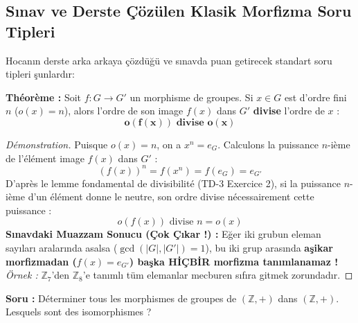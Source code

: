 \documentclass[12pt,a4paper]{report}
\begin{document}
\vspace{0.5cm}

\subsection*{Sınav ve Derste Çözülen Klasik Morfizma Soru Tipleri}

Hocanın derste arka arkaya çözdüğü ve sınavda puan getirecek standart soru tipleri şunlardır:

\begin{tcolorbox}[colback=red!5!white,colframe=red!75!black,title=Soru Tipi 1 (Banko Teorem) : Eleman Mertebesi Morfizmada Bölünür !]
\textbf{Théorème :} Soit $f : G \longrightarrow G'$ un morphisme de groupes.  
Si $x \in G$ est d'ordre fini $n$ ($o(x) = n$), alors l'ordre de son image $f(x)$ dans $G'$ \textbf{divise} l'ordre de $x$ :
\[ \mathbf{o(f(x)) \text{ divise } o(x)} \]
\end{tcolorbox}

\begin{proof}[Démonstration]
Puisque $o(x) = n$, on a $x^n = e_G$.  
Calculons la puissance $n$-ième de l'élément image $f(x)$ dans $G'$ :
\[ (f(x))^n = f(x^n) = f(e_G) = e_{G'} \]
D'après le lemme fondamental de divisibilité (TD-3 Exercice 2), si la puissance $n$-ième d'un élément donne le neutre, son ordre divise nécessairement cette puissance :
\[ o(f(x)) \text{ divise } n = o(x) \]
\textbf{Sınavdaki Muazzam Sonucu (Çok Çıkar !) :}  
Eğer iki grubun eleman sayıları aralarında asalsa ($\gcd(|G|, |G'|) = 1$), bu iki grup arasında \textbf{aşikar morfizmadan ($f(x) = e_{G'}$) başka HİÇBİR morfizma tanımlanamaz !}  
\textit{Örnek :} $\mathbb{Z}_7$'den $\mathbb{Z}_8$'e tanımlı tüm elemanlar mecburen sıfıra gitmek zorundadır.
\end{proof}

\vspace{0.4cm}

\begin{tcolorbox}[colback=blue!5!white,colframe=blue!75!black,title=Soru Tipi 2 : $\mathbb{Z}$'den $\mathbb{Z}$'ye Tüm Morfizmler]
\textbf{Soru :} Déterminer tous les morphismes de groupes de $(\mathbb{Z}, +)$ dans $(\mathbb{Z}, +)$. Lesquels sont des isomorphismes ?
\end{tcolorbox}
\end{document}
